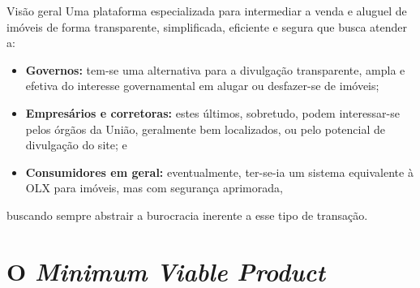 \documentclass[10pt]{beamer}
\begin{document}
\begin{frame}{Visão geral}
    Uma plataforma especializada para intermediar a venda e aluguel de imóveis de forma transparente, simplificada, eficiente e segura que busca atender a:
    
    \begin{itemize}
        \item<+-> \textbf{Governos:} tem-se uma alternativa para a divulgação transparente, ampla e efetiva do interesse governamental em alugar ou desfazer-se de imóveis;
        \item<+-> \textbf{Empresários e corretoras:} estes últimos, sobretudo, podem interessar-se pelos órgãos da União, geralmente bem localizados, ou pelo potencial de divulgação do site; e
        \item<+-> \textbf{Consumidores em geral:} eventualmente, ter-se-ia um sistema equivalente à OLX para imóveis, mas com segurança aprimorada,
    \end{itemize}
    
	buscando sempre abstrair a burocracia inerente a esse tipo de transação.
\end{frame}

\section{O \textit{Minimum Viable Product}}
\end{document}

